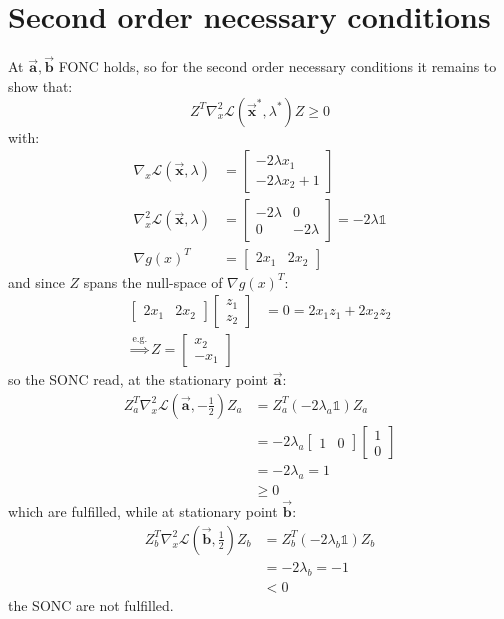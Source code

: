 \documentclass[oneside, a4paper]{book}
\newcommand\vek[1]{\vec{\bm{#1}}}
\newcommand\br[1]{\left(#1\right)}
\begin{document}
\section{Second order necessary conditions}
At $\vek{a}, \vek{b}$ FONC holds, so for the second order necessary conditions it remains to show that:
\[Z^T \nabla^2_x \mathcal{L}(\vek{x}^*, \lambda^*) Z \geq 0\]
with:
\begin{align*}
  \nabla_x \mathcal{L}(\vek{x}, \lambda) &= \begin{bmatrix}
    -2\lambda x_1\\
    -2\lambda x_2 + 1
  \end{bmatrix}\\
  \nabla^2_x \mathcal{L}(\vek{x}, \lambda) &= \begin{bmatrix}
    -2\lambda & 0\\
    0 & -2\lambda
  \end{bmatrix} = -2\lambda\mathds{1}\\
  \nabla g(x)^T &= \begin{bmatrix}
    2x_1 & 2x_2 
  \end{bmatrix}
\end{align*}
and since $Z$ spans the null-space of $\nabla g(x)^T$:
\begin{align*}
  \begin{bmatrix}
    2x_1 & 2x_2 
  \end{bmatrix} \begin{bmatrix}
    z_1\\z_2
  \end{bmatrix} &= 0 = 2x_1z_1 + 2x_2z_2\\
  \overset{\text{e.g.}}{\Longrightarrow} Z = \begin{bmatrix}
    x_2\\-x_1
  \end{bmatrix}
\end{align*}
so the SONC read, at the stationary point $\vek{a}$:
\begin{align*}
  Z_a^T \nabla^2_x \mathcal{L}\br{\vek{a},-\frac{1}{2}} Z_a &= 
   Z_a^T (-2\lambda_a\mathds{1}) Z_a\\ 
  &= -2\lambda_a \begin{bmatrix}1&0\end{bmatrix}
  \begin{bmatrix}1\\0\end{bmatrix}\\
  &= -2\lambda_a = 1\\
  &\geq 0 
\end{align*}
which are fulfilled, while at stationary point $\vek{b}$:
\begin{align*}
  Z_b^T \nabla^2_x \mathcal{L}\br{\vek{b}, \frac{1}{2}} Z_b &= 
   Z_b^T (-2\lambda_b\mathds{1}) Z_b\\ 
  &= -2\lambda_b = -1\\
  &< 0
\end{align*}
the SONC are not fulfilled.
\end{document}
